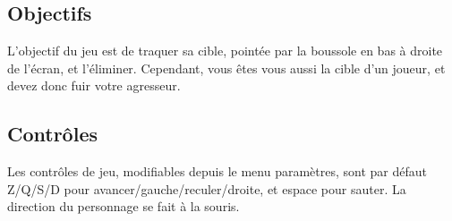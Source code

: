 \subsection{Objectifs}

    L'objectif du jeu est de traquer sa cible, pointée par la boussole en bas à droite de l'écran, et l'éliminer. Cependant, 
    vous êtes vous aussi la cible d'un joueur, et devez donc fuir votre agresseur.


\subsection{Contrôles}

    Les contrôles de jeu, modifiables depuis le menu paramètres, sont par défaut Z/Q/S/D pour 
    avancer/gauche/reculer/droite, et espace pour sauter. La direction du personnage se fait à la souris. 

